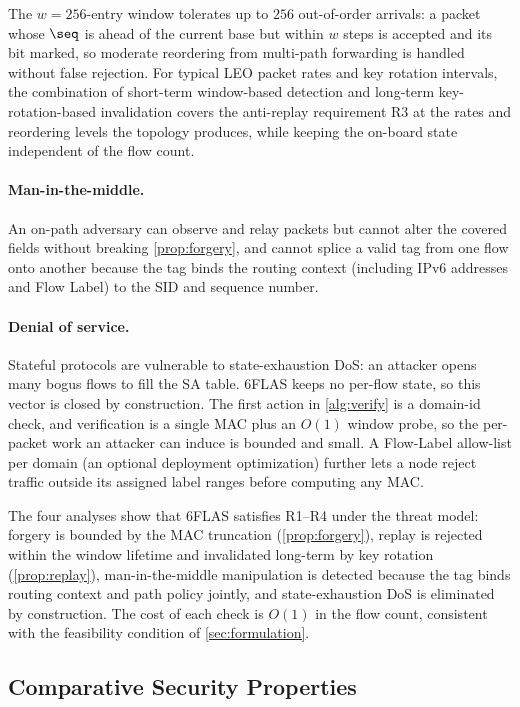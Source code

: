 The $w=256$-entry window tolerates up to $256$ out-of-order arrivals: a packet whose $\seq$ is ahead of the current base but within $w$
steps is accepted and its bit marked, so moderate reordering from multi-path
forwarding is handled without false rejection. For typical LEO packet rates and key rotation intervals, the combination of short-term window-based detection and long-term key-rotation-based invalidation covers the anti-replay requirement R3 at the rates and reordering levels the topology produces, while keeping the on-board state independent of the flow count.

\paragraph{Man-in-the-middle.}
An on-path adversary can observe and relay packets but cannot alter the covered
fields without breaking \cref{prop:forgery}, and cannot splice a valid tag from
one flow onto another because the tag binds the routing context (including IPv6 addresses and Flow Label) to the
SID and sequence number.

\paragraph{Denial of service.}
Stateful protocols are vulnerable to state-exhaustion DoS: an attacker opens
many bogus flows to fill the SA table. 6FLAS keeps no per-flow state, so this
vector is closed by construction. The first action in \cref{alg:verify} is a
domain-id check, and verification is a single MAC plus an $O(1)$ window probe,
so the per-packet work an attacker can induce is bounded and small. A Flow-Label
allow-list per domain (an optional deployment optimization) further lets a node reject traffic outside its assigned
label ranges before computing any MAC.

The four analyses show that 6FLAS satisfies R1--R4 under the
threat model: forgery is bounded by the MAC truncation (\cref{prop:forgery}), replay is
rejected within the window lifetime and invalidated long-term by key rotation (\cref{prop:replay}), man-in-the-middle manipulation is detected because the tag
binds routing context and path policy jointly, and state-exhaustion DoS is
eliminated by construction. The cost of each check is $O(1)$ in the flow count,
consistent with the feasibility condition of \cref{sec:formulation}.

\subsection{Comparative Security Properties}
\label{sec:sec-compare}

